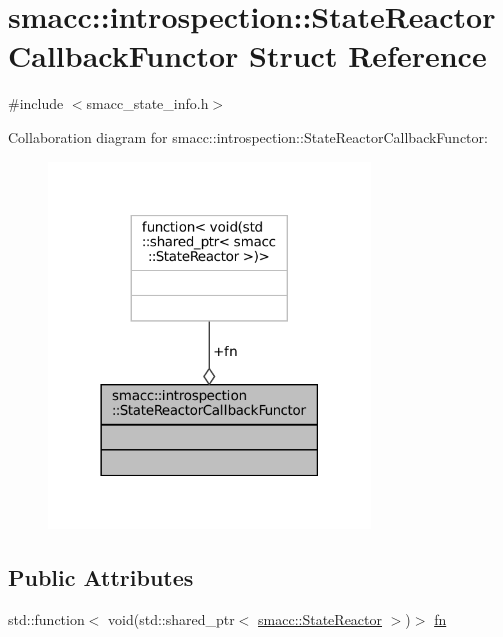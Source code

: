 \hypertarget{structsmacc_1_1introspection_1_1StateReactorCallbackFunctor}{}\section{smacc\+:\+:introspection\+:\+:State\+Reactor\+Callback\+Functor Struct Reference}
\label{structsmacc_1_1introspection_1_1StateReactorCallbackFunctor}


{\ttfamily \#include $<$smacc\+\_\+state\+\_\+info.\+h$>$}



Collaboration diagram for smacc\+:\+:introspection\+:\+:State\+Reactor\+Callback\+Functor\+:
\nopagebreak
\begin{figure}[H]
\begin{center}
\leavevmode
\includegraphics[width=242pt]{structsmacc_1_1introspection_1_1StateReactorCallbackFunctor__coll__graph}
\end{center}
\end{figure}
\subsection*{Public Attributes}
\begin{DoxyCompactItemize}
\item 
std\+::function$<$ void(std\+::shared\+\_\+ptr$<$ \hyperlink{classsmacc_1_1StateReactor}{smacc\+::\+State\+Reactor} $>$)$>$ \hyperlink{structsmacc_1_1introspection_1_1StateReactorCallbackFunctor_a43abfabf0bcfc2edbc06c9809b277f31}{fn}
\end{DoxyCompactItemize}


